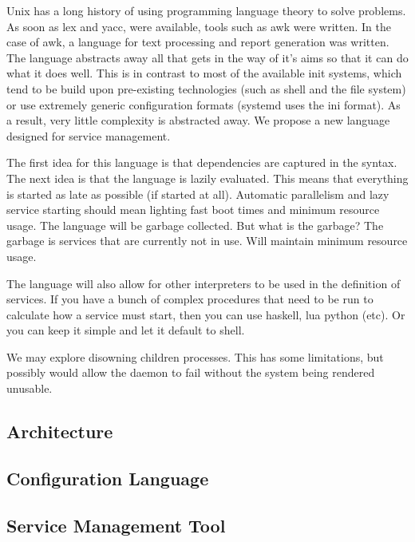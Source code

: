 \documentclass{article}
\newcommand*{\bibtitle}{Bibliography}
\begin{document}
Unix has a long history of using programming language theory to solve problems. As soon as
lex and yacc, were available, tools such as awk were written. In the case of awk, a language
for text processing and report generation was written. The language abstracts away all that
gets in the way of it's aims so that it can do what it does well. This is in contrast to most
of the available init systems, which tend to be build upon pre-existing technologies (such
as shell and the file system) or use extremely generic configuration formats (systemd uses
the ini format). As a result, very little complexity is abstracted away. We propose a
new language designed for service management.

The first idea for this language is that dependencies are captured in the syntax. The next idea
is that the language is lazily evaluated. This means that everything is started as late as possible
(if started at all). Automatic parallelism and lazy service starting should mean lighting fast
boot times and minimum resource usage. The language will be garbage collected. But what is
the garbage? The garbage is services that are currently not in use. Will maintain minimum
resource usage.

The language will also allow for other interpreters to be used in the definition of
services. If you have a bunch of complex procedures that need to be run to calculate how a service
must start, then you can use haskell, lua python (etc). Or you can keep it simple and let it
default to shell.

We may explore disowning children processes. This has some limitations, but possibly would allow
the daemon to fail without the system being rendered unusable.

\subsection{Architecture}
\subsection{Configuration Language}
\subsection{Service Management Tool}

\setlength{\baselineskip}{0pt} %

{\renewcommand*\MakeUppercase[1]{#1}%
\printbibliography[heading=bibintoc,title={\bibtitle}]}
\end{document}
